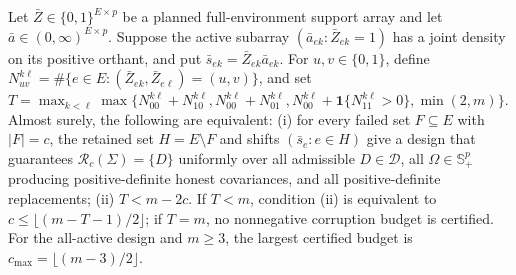 Let \(\bar Z\in\{0,1\}^{E\times p}\) be a planned full-environment support array and let \(\bar a\in(0,\infty)^{E\times p}\). Suppose the active subarray \((\bar a_{ek}:\bar Z_{ek}=1)\) has a joint density on its positive orthant, and put \(\bar s_{ek}=\bar Z_{ek}\bar a_{ek}\). For \(u,v\in\{0,1\}\), define \(N_{uv}^{k\ell}=\#\{e\in E:(\bar Z_{ek},\bar Z_{e\ell})=(u,v)\}\), and set \(T=\max_{k<\ell}\max\{N_{00}^{k\ell}+N_{10}^{k\ell},N_{00}^{k\ell}+N_{01}^{k\ell},N_{00}^{k\ell}+\mathbf 1\{N_{11}^{k\ell}>0\},\min(2,m)\}\). Almost surely, the following are equivalent: (i) for every failed set \(F\subseteq E\) with \(|F|=c\), the retained set \(H=E\setminus F\) and shifts \((\bar s_e:e\in H)\) give a design that guarantees \(\mathcal R_c(\Sigma)=\{D\}\) uniformly over all admissible \(D\in\mathcal D\), all \(\Omega\in\mathbb S_+^p\) producing positive-definite honest covariances, and all positive-definite replacements; (ii) \(T<m-2c\). If \(T<m\), condition (ii) is equivalent to \(c\le\lfloor(m-T-1)/2\rfloor\); if \(T=m\), no nonnegative corruption budget is certified. For the all-active design and \(m\ge3\), the largest certified budget is \(c_{\max}=\lfloor(m-3)/2\rfloor\).